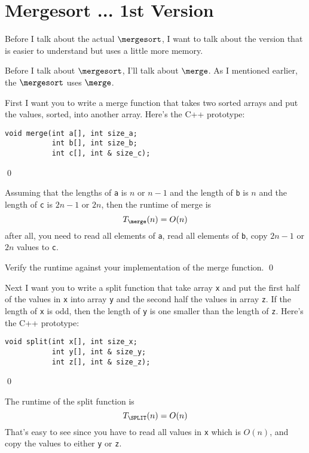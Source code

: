 \section{Mergesort ... 1st Version}



Before I talk about the actual $\mergesort$, I want to 
talk about the version that is easier to understand
but uses a little more memory.

Before I talk about $\mergesort$, I'll talk about $\merge$.
As I mentioned earlier, the $\mergesort$ uses $\merge$.

\begin{ex}
First I want you to write a merge function that 
takes two sorted arrays and put the values, sorted, into another array.
Here's the C++ prototype:
\begin{Verbatim}[frame=single,fontsize=\footnotesize]
void merge(int a[], int size_a;
           int b[], int size_b;
           int c[], int & size_c);
\end{Verbatim}
\qed
\end{ex}

Assuming that the lengths of \verb!a! is $n$ or $n - 1$
and the length of \verb!b! is $n$
and the length of \verb!c! is $2n - 1$ or $2n$, then
the runtime of merge is
\[
T_{\merge}(n) = O(n)
\] 
after all, you need to read all elements of \verb!a!, 
read all elements of \verb!b!, copy
$2n - 1$ or $2n$ values to \verb!c!.

\begin{ex}
Verify the runtime against your implementation of the merge function.
\qed
\end{ex}
 
\begin{ex}
Next I want you to write a split function that 
take array \verb!x! and put 
the first half of the values in \verb!x! into array \verb!y!
and 
the second half the values in array \verb!z!.
If the length of \verb!x! is odd, then 
the length of \verb!y! is one smaller than the length of 
\verb!z!.
Here's the C++ prototype:
\begin{Verbatim}[frame=single,fontsize=\footnotesize]
void split(int x[], int size_x;
           int y[], int & size_y;
           int z[], int & size_z);
\end{Verbatim}
\qed
\end{ex}

The runtime of the split function is
\[
T_{\SPLIT}(n) = O(n)
\]
That's easy to see since you have to read all values in \verb!x!
which is $O(n)$, and copy the values to either \verb!y! 
or \verb!z!.

